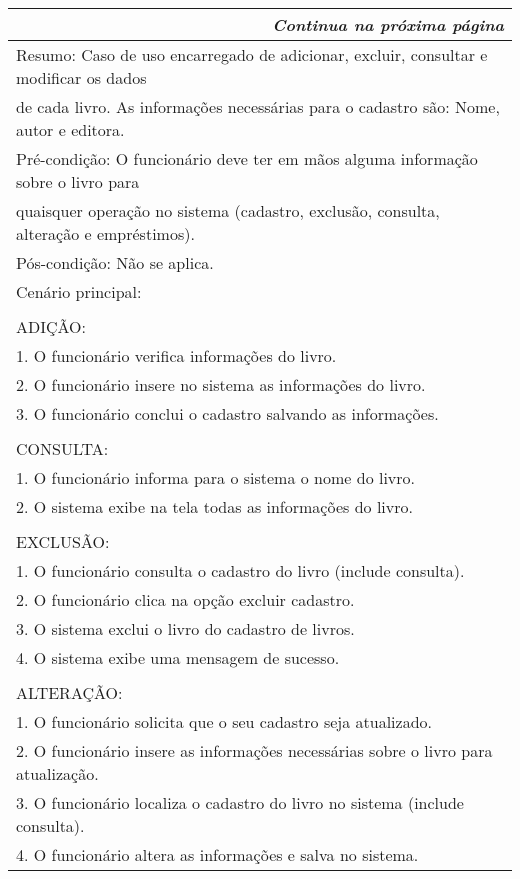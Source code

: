 \begin{longtable}{|l|}
\hline
\endfirsthead %
\hline
\hline
\hline
\endhead
\hline \multicolumn{3}{r}{\emph{Continua na próxima página}}%
\endfoot
\hline
\endlastfoot
Nome: Manter Livro\\ \hline
Resumo: Caso de uso encarregado de adicionar, excluir, consultar e modificar os dados \\ de cada livro. As informações necessárias para o cadastro são: Nome, autor e editora.\\ \hline
Pré-condição: O funcionário deve ter em mãos alguma informação sobre o livro para\\ quaisquer operação no sistema (cadastro, exclusão, consulta, alteração e empréstimos).\\ \hline
Pós-condição: Não se aplica.\\ \hline
Cenário principal:\\ \\ ADIÇÃO:\\        1. O funcionário verifica informações do livro.\\        2. O funcionário insere no sistema as informações do livro.\\        3. O funcionário conclui o cadastro salvando as informações.\\ \\ CONSULTA:\\        1. O funcionário informa para o sistema o nome do livro.\\        2. O sistema exibe na tela todas as informações do livro.\\ \\ EXCLUSÃO:\\        1. O funcionário consulta o cadastro do livro (include consulta).\\        2. O funcionário clica na opção excluir cadastro.\\        3. O sistema exclui o livro do cadastro de livros.\\        4. O sistema exibe uma mensagem de sucesso.\\ \\ ALTERAÇÃO:\\        1. O funcionário solicita que o seu cadastro seja atualizado.\\        2. O funcionário insere as informações necessárias sobre o livro para atualização.\\        3. O funcionário localiza o cadastro do livro no sistema (include consulta).\\        4. O funcionário altera as informações e salva no sistema.\\ \hline

\end{longtable}
